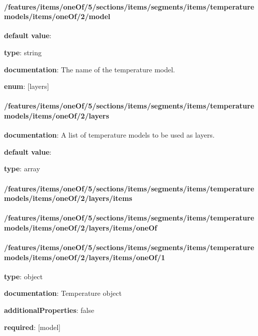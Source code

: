 \paragraph{/features/items/oneOf/5/sections/items/segments/items/temperature models/items/oneOf/2/model} \begin{itemized}
\item {\bf default value}: 
\item {\bf type}: string
\item {\bf documentation}: The name of the temperature model.
\item {\bf enum}: [layers]\end{itemized}\paragraph{/features/items/oneOf/5/sections/items/segments/items/temperature models/items/oneOf/2/layers} \begin{itemized}
\item {\bf documentation}: A list of temperature models to be used as layers.
\item {\bf default value}: 
\item {\bf type}: array
\paragraph{/features/items/oneOf/5/sections/items/segments/items/temperature models/items/oneOf/2/layers/items} \begin{itemized}
\end{itemized}\end{itemized}\paragraph{/features/items/oneOf/5/sections/items/segments/items/temperature models/items/oneOf/2/layers/items/oneOf} \begin{itemized}
\end{itemized}\paragraph{/features/items/oneOf/5/sections/items/segments/items/temperature models/items/oneOf/2/layers/items/oneOf/1} \begin{itemized}
\item {\bf type}: object
\item {\bf documentation}: Temperature object
\item {\bf additionalProperties}: false
\item {\bf required}: [model]\end{itemized}
